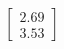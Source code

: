 \documentclass[preview]{standalone}
\begin{document}
\begin{align*}
\begin{bmatrix} 2.69 \\ 3.53 \end{bmatrix}
\end{align*}
\end{document}
